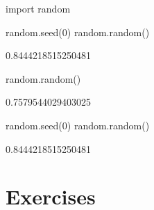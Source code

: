 \begin{pyin}
import random

random.seed(0)
random.random()
\end{pyin}





\begin{raw}
0.8444218515250481
\end{raw}







\begin{pyin}
random.random()
\end{pyin}





\begin{raw}
0.7579544029403025
\end{raw}







\begin{pyin}
random.seed(0)
random.random()
\end{pyin}





\begin{raw}
0.8444218515250481
\end{raw}


\section{Exercises}
\label{\detokenize{tools-for-mathematics/06-probability/exercises/main:exercises}}\label{\detokenize{tools-for-mathematics/06-probability/exercises/main::doc}}

